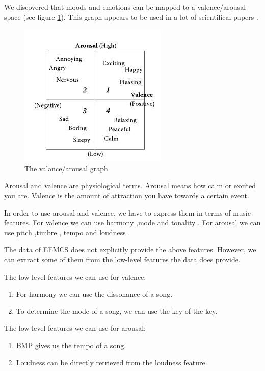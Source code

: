 \documentclass[10pt,a4paper]{article}
\begin{document}
We discovered that moods and emotions can be mapped to a valence/arousal space (see figure \ref{fig:avgraph}).
This graph appears to be used in a lot of scientifical papers \cite{Kosina} \cite{McVicar}.

\begin{figure}[h]
\includegraphics[scale=0.75]{avgraph.jpg}
\caption{The valance/arousal graph \cite{Book}}
\label{fig:avgraph}

\end{figure}

Arousal and valence are physiological terms.
Arousal means how calm or excited you are.
Valence is the amount of attraction you have towards a certain event.

In order to use arousal and valence, we have to express them in terms of music features.
For valence we can use harmony \cite{PresentationMER},mode  \cite{PresentationMER} and tonality  \cite{PresentationMER}.
For arousal we can use pitch \cite{PresentationMER} ,timbre \cite{PresentationMER}, tempo \cite{PresentationMER} and loudness \cite{PaperME}.

\newpage

The data of EEMCS does not explicitly provide the above features. However, we can extract some of them from the low-level features the data does provide.

The low-level features we can use for valence:
\begin{enumerate}
\item For harmony we can use the dissonance of a song.
\item To determine the mode of a song, we can use the key of the key.
\end{enumerate}
The low-level features we can use for arousal:
\begin{enumerate}
\item BMP gives us the tempo of a song.
\item Loudness can be directly retrieved from the loudness feature.
\end{enumerate}
\end{document}
